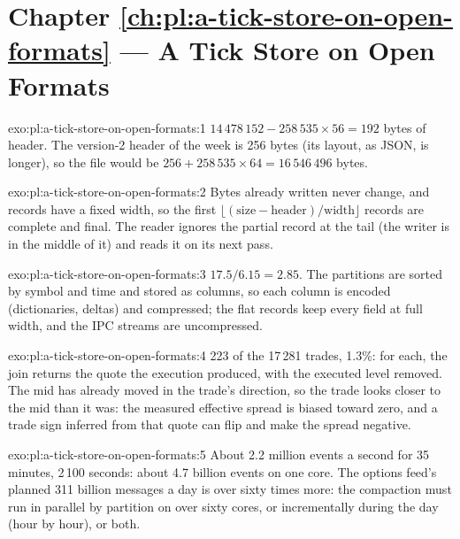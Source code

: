 \section*{Chapter \ref{ch:pl:a-tick-store-on-open-formats} --- A Tick Store on Open Formats}

\begin{solution}{exo:pl:a-tick-store-on-open-formats:1}
$14\,478\,152 - 258\,535 \times 56 = 192$ bytes of header. The version-2 header of the week is 256 bytes (its layout, as JSON,
is longer), so the file would be $256 + 258\,535 \times 64 = 16\,546\,496$ bytes.
\end{solution}

\begin{solution}{exo:pl:a-tick-store-on-open-formats:2}
Bytes already written never change, and records have a fixed width, so the first
$\lfloor (\text{size} - \text{header}) / \text{width} \rfloor$ records are complete and final. The reader ignores the partial
record at the tail (the writer is in the middle of it) and reads it on its next pass.
\end{solution}

\begin{solution}{exo:pl:a-tick-store-on-open-formats:3}
$17.5 / 6.15 = 2.85$. The partitions are sorted by symbol and time and stored as columns, so each column is encoded (dictionaries,
deltas) and compressed; the flat records keep every field at full width, and the IPC streams are uncompressed.
\end{solution}

\begin{solution}{exo:pl:a-tick-store-on-open-formats:4}
223 of the 17\,281 trades, 1.3\%: for each, the join returns the quote the execution produced, with the executed level removed.
The mid has already moved in the trade's direction, so the trade looks closer to the mid than it was: the measured effective
spread is biased toward zero, and a trade sign inferred from that quote can flip and make the spread negative.
\end{solution}

\begin{solution}{exo:pl:a-tick-store-on-open-formats:5}
About 2.2 million events a second for 35 minutes, 2\,100 seconds: about 4.7 billion events on one core. The options feed's
planned 311 billion messages a day is over sixty times more: the compaction must run in parallel by partition on
over sixty cores, or incrementally during the day (hour by hour), or both.
\end{solution}

